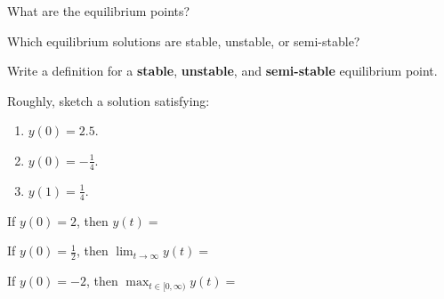 \begin{parts}
	\item What are the equilibrium points?
	\item Which equilibrium solutions are stable, unstable, or semi-stable?
	\item Write a definition for a \textbf{stable}, \textbf{unstable}, and \textbf{semi-stable} equilibrium point.
	\item Roughly, sketch a solution satisfying:
	\begin{enumerate}
		\item $y(0)=2.5$.
		\item $y(0)=-\frac14$.
		\item $y(1)=\frac14$.
	\end{enumerate}
	\item If $y(0) = 2$, then $y(t) = $
	\item If $y(0) = \frac12$, then $\displaystyle \lim_{t\to \infty} y(t) = $
	\item If $y(0) = -2$, then $\displaystyle \max_{t \in [0,\infty)} y(t) = $
\end{parts}


\bookonlynewpage


\hfill


\bookonlynewpage




